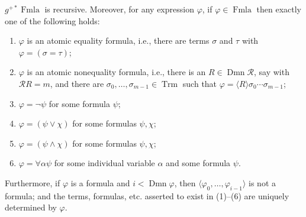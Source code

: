 $g^{+*} \operatorname{Fmla}$ is recursive. Moreover, for any expression $\varphi$, if $\varphi \in \operatorname{Fmla}$ then exactly one of the following holds:
\begin{enumerate}
\item[(1)] $\varphi$ is an atomic equality formula, i.e., there are terms $\sigma$ and $\tau$ with $\varphi = (\sigma = \tau)$;
\item[(2)] $\varphi$ is an atomic nonequality formula, i.e., there is an $R \in \operatorname{Dmn} \mathcal{R}$, say with $\mathcal{R}R = m$, and there are $\sigma_0, \ldots, \sigma_{m-1} \in \operatorname{Trm}$ such that $\varphi = \langle R \rangle \sigma_0 \cdots \sigma_{m-1}$;
\item[(3)] $\varphi = \neg \psi$ for some formula $\psi$;
\item[(4)] $\varphi = (\psi \vee \chi)$ for some formulas $\psi, \chi$;
\item[(5)] $\varphi = (\psi \wedge \chi)$ for some formulas $\psi, \chi$;
\item[(6)] $\varphi = \forall \alpha \psi$ for some individual variable $\alpha$ and some formula $\psi$.
\end{enumerate}
Furthermore, if $\varphi$ is a formula and $i < \operatorname{Dmn} \varphi$, then $\langle \varphi_0, \ldots, \varphi_{i-1} \rangle$ is not a formula; and the terms, formulas, etc. asserted to exist in (1)--(6) are uniquely determined by $\varphi$.
